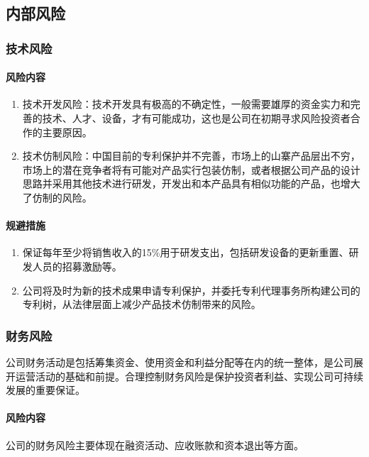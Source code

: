 \documentclass[violet]{main}
\begin{document}
			\subsection{内部风险}
				\subsubsection{技术风险}
					\paragraph{风险内容}
						\begin{enumerate}
								\item 技术开发风险：技术开发具有极高的不确定性，一般需要雄厚的资金实力和完善的技术、人才、设备，才有可能成功，这也是公司在初期寻求风险投资者合作的主要原因。
								\item 技术仿制风险：中国目前的专利保护并不完善，市场上的山寨产品层出不穷，市场上的潜在竞争者将有可能对产品实行包装仿制，或者根据公司产品的设计思路并采用其他技术进行研发，开发出和本产品具有相似功能的产品，也增大了仿制的风险。
						\end{enumerate}
					\paragraph{规避措施}
						\begin{enumerate}
							\item 保证每年至少将销售收入的15\%用于研发支出，包括研发设备的更新重置、研发人员的招募激励等。
							\item 公司将及时为新的技术成果申请专利保护，并委托专利代理事务所构建公司的专利树，从法律层面上减少产品技术仿制带来的风险。
						\end{enumerate}
				\subsubsection{财务风险}
					公司财务活动是包括筹集资金、使用资金和利益分配等在内的统一整体，是公司展开运营活动的基础和前提。合理控制财务风险是保护投资者利益、实现公司可持续发展的重要保证。
					\paragraph{风险内容}
						公司的财务风险主要体现在融资活动、应收账款和资本退出等方面。
\end{document}
